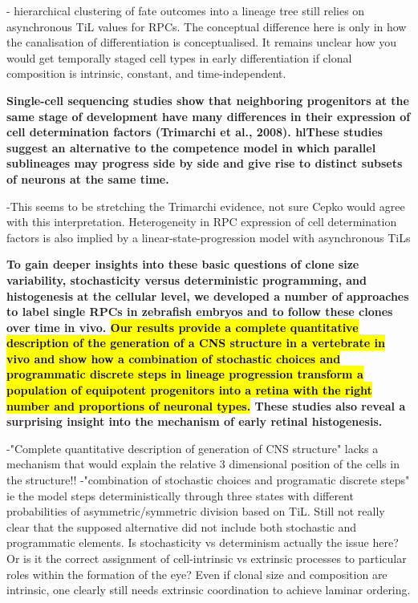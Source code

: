 - hierarchical clustering of fate outcomes into a lineage tree still relies on asynchronous TiL values for RPCs. The conceptual difference here is only in how the canalisation of differentiation is conceptualised. It remains unclear how you would get temporally staged cell types in early differentiation if clonal composition is intrinsic, constant, and time-independent.

\bigskip

\textbf{
Single-cell sequencing studies show that neighboring progenitors at the
same stage of development have many differences in their
expression of cell determination factors (Trimarchi et al., 2008).
hl{These studies suggest an alternative to the competence model
in which parallel sublineages may progress side by side and
give rise to distinct subsets of neurons at the same time.}
}

\bigskip

-This seems to be stretching the Trimarchi evidence, not sure Cepko would agree with this interpretation. Heterogeneity in RPC expression of cell determination factors is also implied by a linear-state-progression model with asynchronous TiLs

\bigskip

\textbf{
To gain deeper insights into these basic questions of clone
size variability, stochasticity versus deterministic programming,
and histogenesis at the cellular level, we developed a number
of approaches to label single RPCs in zebrafish embryos and
to follow these clones over time in vivo. \hl{Our results provide
a complete quantitative description of the generation of a CNS
structure in a vertebrate in vivo and show how a combination
of stochastic choices and programmatic discrete steps in
lineage progression transform a population of equipotent
progenitors into a retina with the right number and proportions
of neuronal types.} These studies also reveal a surprising insight
into the mechanism of early retinal histogenesis.
}

\bigskip

-"Complete quantitative description of generation of CNS structure" lacks a mechanism that would explain the relative 3 dimensional position of the cells in the structure!!
-"combination of stochastic choices and programatic discrete steps" ie the model steps deterministically through three states with different probabilities of asymmetric/symmetric division based on TiL. Still not really clear that the supposed alternative did not include both stochastic and programmatic elements. Is stochasticity vs determinism actually the issue here? Or is it the correct assignment of cell-intrinsic vs extrinsic processes to particular roles within the formation of the eye? Even if clonal size and composition are intrinsic, one clearly still needs extrinsic coordination to achieve laminar ordering.

